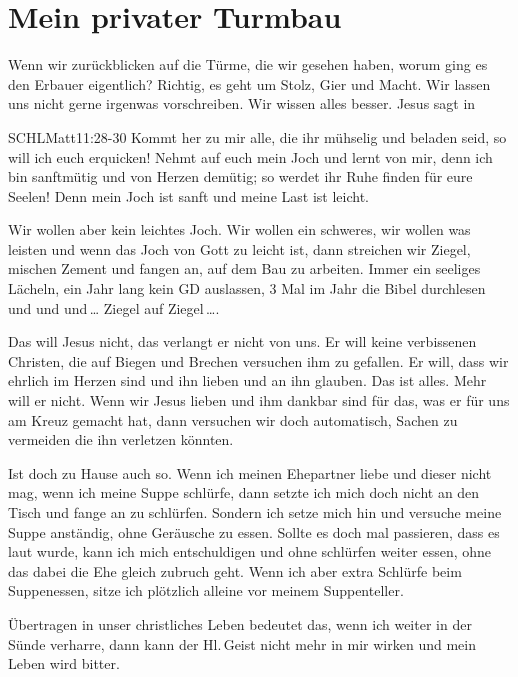 \documentclass[fontsize=16pt]{mybib}
\begin{document}
    \section{Mein privater Turmbau}
\begin{otsblock}
    Wenn wir zurückblicken auf die Türme, die wir gesehen haben, worum ging es den Erbauer eigentlich? Richtig, es geht um Stolz, Gier und Macht. Wir lassen uns nicht gerne irgenwas vorschreiben. Wir wissen alles besser. Jesus sagt in  
    \begin{bibelbox}{SCHL}{Matt}{11:28-30}
        Kommt her zu mir alle, die ihr mühselig und beladen seid, so will ich euch erquicken!
        Nehmt auf euch mein Joch und lernt von mir, denn ich bin sanftmütig und von Herzen demütig; so werdet ihr Ruhe finden für eure Seelen!
        Denn mein Joch ist sanft und meine Last ist leicht.
    \end{bibelbox}  
    Wir wollen aber kein leichtes Joch. Wir wollen ein schweres, wir wollen was leisten und wenn das Joch von Gott zu leicht ist, dann streichen wir Ziegel, mischen Zement und fangen an, auf dem Bau zu arbeiten. Immer ein seeliges Lächeln, ein Jahr lang kein GD auslassen, 3 Mal im Jahr die Bibel durchlesen und und und\,\dots{} Ziegel auf Ziegel\,\dots{}.
\end{otsblock}
\begin{otsblock}
    Das will Jesus nicht, das verlangt er nicht von uns. Er will keine verbissenen Christen, die auf Biegen und Brechen versuchen ihm zu gefallen. Er will, dass wir ehrlich im Herzen sind und ihn lieben und an ihn glauben. Das ist alles. Mehr will er nicht. Wenn wir Jesus lieben und ihm dankbar sind für das, was er für uns am Kreuz gemacht hat, dann versuchen wir doch automatisch, Sachen zu vermeiden die ihn verletzen könnten. 
    
    Ist doch zu Hause auch so. Wenn ich meinen Ehepartner liebe und dieser nicht mag, wenn ich meine Suppe schlürfe, dann setzte ich mich doch nicht an den Tisch und fange an zu schlürfen. Sondern ich setze mich hin und versuche meine Suppe anständig, ohne Geräusche zu essen. Sollte es doch mal passieren, dass es laut wurde, kann ich mich entschuldigen und ohne schlürfen weiter essen, ohne das dabei die Ehe gleich zubruch geht. Wenn ich aber extra Schlürfe beim Suppenessen, sitze ich plötzlich alleine vor meinem Suppenteller.

    Übertragen in unser christliches Leben bedeutet das, wenn ich weiter in der Sünde verharre, dann kann der Hl.\,Geist nicht mehr in mir wirken und mein Leben wird bitter.
\end{otsblock}
\end{document}
